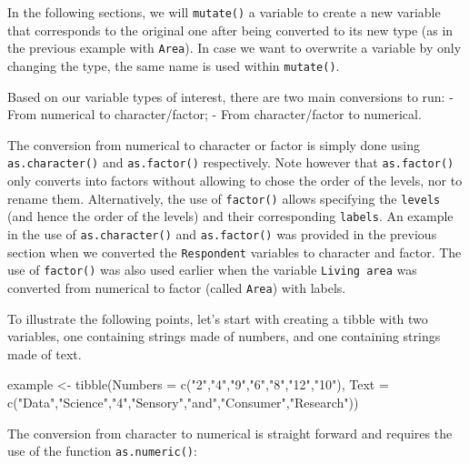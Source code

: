 \documentclass[
]{book}
\newenvironment{Shaded}{\begin{snugshade}}{\end{snugshade}}
\newcommand{\AttributeTok}[1]{\textcolor[rgb]{0.77,0.63,0.00}{#1}}
\newcommand{\FunctionTok}[1]{\textcolor[rgb]{0.00,0.00,0.00}{#1}}
\newcommand{\NormalTok}[1]{#1}
\newcommand{\OtherTok}[1]{\textcolor[rgb]{0.56,0.35,0.01}{#1}}
\newcommand{\StringTok}[1]{\textcolor[rgb]{0.31,0.60,0.02}{#1}}
\begin{document}
In the following sections, we will \texttt{mutate()} a variable to create a new variable that corresponds to the original one after being converted to its new type (as in the previous example with \texttt{Area}). In case we want to overwrite a variable by only changing the type, the same name is used within \texttt{mutate()}.

Based on our variable types of interest, there are two main conversions to run:
- From numerical to character/factor;
- From character/factor to numerical.

The conversion from numerical to character or factor is simply done using \texttt{as.character()} and \texttt{as.factor()} respectively. Note however that \texttt{as.factor()} only converts into factors without allowing to chose the order of the levels, nor to rename them. Alternatively, the use of \texttt{factor()} allows specifying the \texttt{levels} (and hence the order of the levels) and their corresponding \texttt{labels}. An example in the use of \texttt{as.character()} and \texttt{as.factor()} was provided in the previous section when we converted the \texttt{Respondent} variables to character and factor. The use of \texttt{factor()} was also used earlier when the variable \texttt{Living\ area} was converted from numerical to factor (called \texttt{Area}) with labels.

To illustrate the following points, let's start with creating a tibble with two variables, one containing strings made of numbers, and one containing strings made of text.

\begin{Shaded}
\begin{Highlighting}[]
\NormalTok{example }\OtherTok{\textless{}{-}} \FunctionTok{tibble}\NormalTok{(}\AttributeTok{Numbers =} \FunctionTok{c}\NormalTok{(}\StringTok{"2"}\NormalTok{,}\StringTok{"4"}\NormalTok{,}\StringTok{"9"}\NormalTok{,}\StringTok{"6"}\NormalTok{,}\StringTok{"8"}\NormalTok{,}\StringTok{"12"}\NormalTok{,}\StringTok{"10"}\NormalTok{),}
                  \AttributeTok{Text =} \FunctionTok{c}\NormalTok{(}\StringTok{"Data"}\NormalTok{,}\StringTok{"Science"}\NormalTok{,}\StringTok{"4"}\NormalTok{,}\StringTok{"Sensory"}\NormalTok{,}\StringTok{"and"}\NormalTok{,}\StringTok{"Consumer"}\NormalTok{,}\StringTok{"Research"}\NormalTok{))}
\end{Highlighting}
\end{Shaded}

The conversion from character to numerical is straight forward and requires the use of the function \texttt{as.numeric()}:
\end{document}
